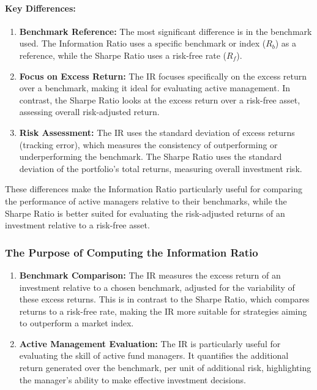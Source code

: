 \documentclass{article}
\begin{document}
\paragraph{Key Differences:}
\begin{enumerate}
    \item \textbf{Benchmark Reference:}
    The most significant difference is in the benchmark used. The Information Ratio uses a specific benchmark or index (\( R_b \)) as a reference, while the Sharpe Ratio uses a risk-free rate (\( R_f \)).

    \item \textbf{Focus on Excess Return:}
    The IR focuses specifically on the excess return over a benchmark, making it ideal for evaluating active management. In contrast, the Sharpe Ratio looks at the excess return over a risk-free asset, assessing overall risk-adjusted return.

    \item \textbf{Risk Assessment:}
    The IR uses the standard deviation of excess returns (tracking error), which measures the consistency of outperforming or underperforming the benchmark. The Sharpe Ratio uses the standard deviation of the portfolio’s total returns, measuring overall investment risk.
\end{enumerate}

These differences make the Information Ratio particularly useful for comparing the performance of active managers relative to their benchmarks, while the Sharpe Ratio is better suited for evaluating the risk-adjusted returns of an investment relative to a risk-free asset.

\subsubsection{The Purpose of Computing the Information Ratio}

\begin{enumerate}
    \item \textbf{Benchmark Comparison:}
    The IR measures the excess return of an investment relative to a chosen benchmark, adjusted for the variability of these excess returns. This is in contrast to the Sharpe Ratio, which compares returns to a risk-free rate, making the IR more suitable for strategies aiming to outperform a market index.

    \item \textbf{Active Management Evaluation:}
    The IR is particularly useful for evaluating the skill of active fund managers. It quantifies the additional return generated over the benchmark, per unit of additional risk, highlighting the manager's ability to make effective investment decisions.
\end{enumerate}
\end{document}
